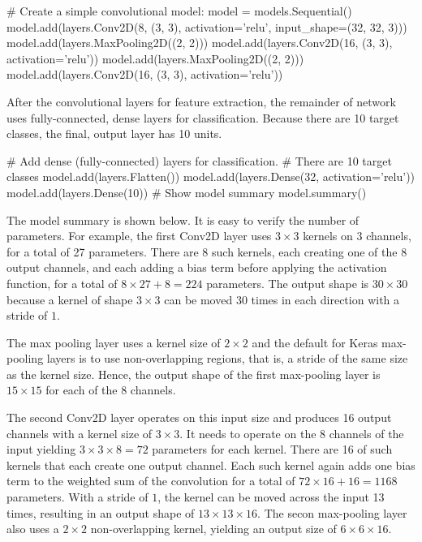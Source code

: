 \begin{samepage}
\begin{pythoncode}
# Create a simple convolutional model:
model = models.Sequential()
model.add(layers.Conv2D(8, (3, 3), activation='relu', 
    input_shape=(32, 32, 3)))
model.add(layers.MaxPooling2D((2, 2)))
model.add(layers.Conv2D(16, (3, 3), activation='relu'))
model.add(layers.MaxPooling2D((2, 2)))
model.add(layers.Conv2D(16, (3, 3), activation='relu'))
\end{pythoncode}
\end{samepage}

After the convolutional layers for feature extraction, the remainder of network uses fully-connected, dense layers for classification. Because there are 10 target classes, the final, output layer has 10 units.

\begin{samepage}
\begin{pythoncode}
# Add dense (fully-connected) layers for classification. 
# There are 10 target classes
model.add(layers.Flatten())
model.add(layers.Dense(32, activation='relu'))
model.add(layers.Dense(10))
# Show model summary
model.summary()
\end{pythoncode}
\end{samepage}

The model summary is shown below. It is easy to verify the number of parameters. For example, the first Conv2D layer uses $3 \times 3$ kernels on 3 channels, for a total of 27 parameters. There are 8 such kernels, each creating one of the 8 output channels, and each adding a bias term before applying the activation function, for a total of $8 \times 27 + 8 = 224$ parameters. The output shape is $30 \times 30$ because a kernel of shape $3 \times 3$ can be moved 30 times in each direction with a stride of $1$.

The max pooling layer uses a kernel size of $2 \times 2$ and the default for Keras max-pooling layers is to use non-overlapping regions, that is, a stride of the same size as the kernel size. Hence, the output shape of the first max-pooling layer is $15 \times 15$ for each of the 8 channels. 

The second Conv2D layer operates on this input size and produces 16 output channels with a kernel size of $3 \times 3$. It needs to operate on the 8 channels of the input yielding $3 \times 3 \times 8 = 72$ parameters for each kernel. There are 16 of such kernels that each create one output channel. Each such kernel again adds one bias term to the weighted sum of the convolution for a total of $72 \times 16 + 16 = 1168$ parameters. With a stride of $1$, the kernel can be moved across the input 13 times, resulting in an output shape of $13 \times 13 \times 16$. The secon max-pooling layer also uses a $2 \times 2$ non-overlapping kernel, yielding an output size of $6 \times 6 \times 16$.

